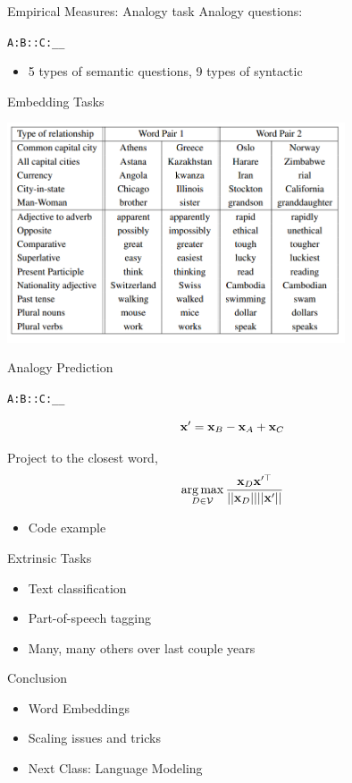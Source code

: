 \documentclass{beamer}
\begin{document}
\begin{frame}{Empirical Measures: Analogy task }
  Analogy questions:

  \begin{center}
    {\large \texttt{A:B::C:\_\_} }
  \end{center}


  \begin{itemize}
  \item 5 types of semantic questions, 9 types of syntactic
  \end{itemize}
\end{frame}

\begin{frame}{Embedding Tasks}
  \begin{center}
    \includegraphics[width=10cm]{analogy}
  \end{center}
\end{frame}


\begin{frame}{Analogy Prediction}

  \begin{center}
    {\large \texttt{A:B::C:\_\_} }
  \end{center}

  \[ \mathbf{x}' = \mathbf{x}_{B} - \mathbf{x}_{A} + \mathbf{x}_{C} \]

  Project to the closest word,
  \[ \argmax_{D \in \mcV}\frac{\boldx_{D} \boldx'^{\top}}{||\boldx_{D} || || \boldx'||  } \]

  \begin{itemize}
  \item Code example
  \end{itemize}
\end{frame}

\begin{frame}{Extrinsic Tasks}
  \begin{itemize}
  \item Text classification
    \air

  \item Part-of-speech tagging
    \air


  \item Many, many others over last couple years
  \end{itemize}
\end{frame}

\begin{frame}{Conclusion}
  \begin{itemize}
  \item Word Embeddings
    \air
  \item Scaling issues and tricks

    \air
  \item Next Class: Language Modeling
  \end{itemize}
\end{frame}
\end{document}
